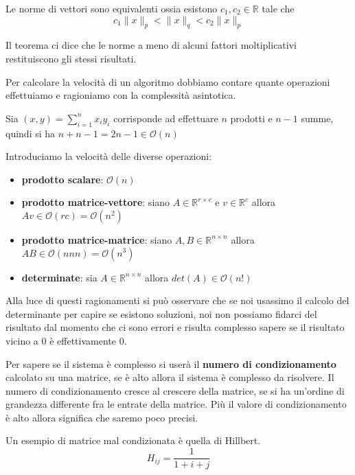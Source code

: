 \begin{teorema}
    Le norme di vettori sono equivalenti ossia esistono $c_1,c_2\in \mathbb{R}$ 
    tale che 
    \begin{equation*}
        c_1\|x\|_p < \|x\|_q < c_2\|x\|_p
    \end{equation*}
\end{teorema}
Il teorema ci dice che le norme a meno di alcuni fattori moltiplicativi restituiscono
gli stessi risultati.

Per calcolare la velocità di un algoritmo dobbiamo contare quante operazioni effettuiamo
e ragioniamo con la complessità asintotica.
\begin{esempio}
    Sia $(x,y) = \sum_{i=1}^n x_iy_i$ corrisponde ad effettuare $n$ prodotti e $n-1$ summe,
    quindi si ha $n+n-1 = 2n-1 \in \mathcal{O}(n)$ 
\end{esempio}

Introduciamo la velocità delle diverse operazioni:
\begin{itemize}
    \item \textbf{prodotto scalare}: $\mathcal{O}(n)$
    \item \textbf{prodotto matrice-vettore}: siano $A\in \mathbb{R}^{r\times c}$ e $v\in \mathbb{R}^c$
    allora $Av\in \mathcal{O} (rc) = \mathcal{O}(n^2)$ 
    \item \textbf{prodotto matrice-matrice}: siano $A,B\in \mathbb{R}^{n\times n}$
    allora $AB\in \mathcal{O} (nnn) = \mathcal{O} (n^3)$ 
    \item \textbf{determinate}: sia $A\in \mathbb{R}^{n\times n}$ allora $det(A) \in  \mathcal{O}(n!)$
\end{itemize}

Alla luce di questi ragionamenti si può osservare che se noi usassimo il calcolo
del determinante per capire se esistono soluzioni, noi non possiamo fidarci del 
risultato dal momento che ci sono errori e risulta complesso sapere se il risultato
vicino a $0$ è effettivamente $0$.

Per sapere se il sistema è complesso si userà il \textbf{numero di condizionamento}
calcolato su una matrice, se è alto allora il sistema è complesso da risolvere.
Il numero di condizionamento cresce al crescere della matrice, se si ha un'ordine di 
grandezza differente fra le entrate della matrice. Più il valore di condizionamento
è alto allora significa che saremo poco precisi.

\begin{esempio}
    Un esempio di matrice mal condizionata è quella di Hillbert.
    \begin{equation*}
        H_{ij}=\frac{1}{1+i+j}
    \end{equation*}
\end{esempio}

